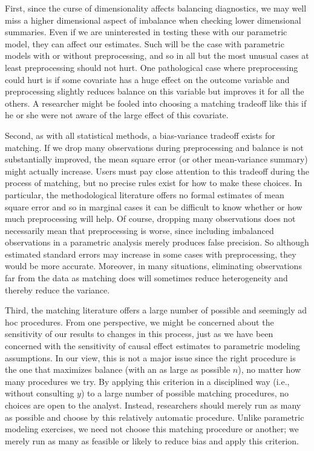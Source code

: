 \documentclass[11pt,titlepage]{article}
\begin{document}
First, since the curse of dimensionality affects balancing
diagnostics, we may well miss a higher dimensional aspect of imbalance
when checking lower dimensional summaries.  Even if we are
uninterested in testing these with our parametric model, they can
affect our estimates.  Such will be the case with parametric models
with or without preprocessing, and so in all but the most unusual
cases at least preprocessing should not hurt.  One pathological case
where preprocessing could hurt is if some covariate has a huge effect
on the outcome variable and preprocessing slightly reduces balance on
this variable but improves it for all the others.  A researcher might
be fooled into choosing a matching tradeoff like this if he or she
were not aware of the large effect of this covariate.

Second, as with all statistical methods, a bias-variance tradeoff
exists for matching.  If we drop many observations during
preprocessing and balance is not substantially improved, the mean
square error (or other mean-variance summary) might actually increase.
Users must pay close attention to this tradeoff during the process of
matching, but no precise rules exist for how to make these choices.
In particular, the methodological literature offers no formal
estimates of mean square error and so in marginal cases it can be
difficult to know whether or how much preprocessing will help.  Of
course, dropping many observations does not necessarily mean that
preprocessing is worse, since including imbalanced observations in a
parametric analysis merely produces false precision.  So although
estimated standard errors may increase in some cases with
preprocessing, they would be more accurate.  Moreover, in many
situations, eliminating observations far from the data as matching
does will sometimes reduce heterogeneity and thereby reduce the
variance.

Third, the matching literature offers a large number of possible and
seemingly ad hoc procedures.  From one perspective, we might be
concerned about the sensitivity of our results to changes in this
process, just as we have been concerned with the sensitivity of causal
effect estimates to parametric modeling assumptions.  In our view,
this is not a major issue since the right procedure is the one that
maximizes balance (with an as large as possible $n$), no matter how
many procedures we try.  By applying this criterion in a disciplined
way (i.e., without consulting $y$) to a large number of possible
matching procedures, no choices are open to the analyst.  Instead,
researchers should merely run as many as possible and choose by this
relatively automatic procedure.  Unlike parametric modeling exercises,
we need not choose this matching procedure or another; we merely run
as many as feasible or likely to reduce bias and apply this criterion.
\end{document}
